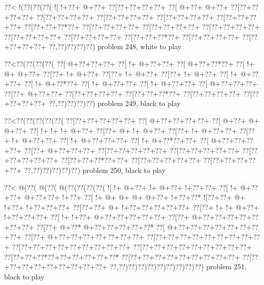 \vbox{\vbox{\goo
\0??<\- !(\0??(\0??(\0??(
\- ![\- !+\0??+\- @+\0??+
\0??[\0??+\0??+\0??+\0??+
\0??[\- @+\0??+\- @+\0??+
\0??[\0??+\0??+\0??+\0??+
\0??[\0??+\0??+\0??+\0??+
\0??[\0??+\0??+\0??+\0??+
\0??[\0??+\0??+\0??+\0??+
\0??[\0??+\0??+\0??+\0??+
\0??[\0??+\0??+\0??*\0??+
\0??[\0??+\0??+\0??+\0??+
\0??[\0??+\0??+\0??+\0??+
\0??[\0??+\0??+\0??+\0??+
\0??[\0??+\0??+\0??+\0??+
\0??[\0??+\0??+\0??+\0??+
\0??[\0??+\0??+\0??*\0??+
\0??[\0??+\0??+\0??+\0??+
\0??[\0??+\0??+\0??+\0??+
\0??,\0??)\0??)\0??)\0??)
}
\hfil problem 248, white to play\hfil\break
}

\vbox{\vbox{\goo
\0??<\0??(\0??(\0??(\0??(
\0??[\- @+\0??+\0??+\0??+
\0??[\- !+\- @+\0??+\0??+
\0??[\- @+\0??+\0??*\0??+
\0??[\- !+\- @+\- @+\0??+
\0??[\0??+\- !+\- @+\0??+
\0??[\0??+\- !+\- @+\0??+
\0??[\0??+\- !+\- @+\0??+
\0??[\- !+\- @+\0??+\0??+
\0??[\- !+\- @+\0??*\0??+
\0??[\- !+\- @+\0??+\0??+
\0??[\- !+\- @+\0??+\0??+
\0??[\- @+\0??+\0??+\0??+
\0??[\0??+\- @+\0??+\0??+
\0??[\0??+\0??+\0??+\0??+
\0??[\0??+\0??+\0??*\0??+
\0??[\0??+\0??+\0??+\0??+
\0??[\0??+\0??+\0??+\0??+
\0??,\0??)\0??)\0??)\0??)
}
\hfil problem 249, black to play\hfil\break
}

\vbox{\vbox{\goo
\0??<\0??(\0??(\0??(\0??(\0??(
\0??[\0??+\0??+\0??+\0??+\0??+
\0??[\- @+\0??+\0??+\0??+\0??+
\0??[\- @+\0??+\- @+\- @+\0??+
\0??[\- !+\- !+\- !+\- @+\0??+
\0??[\0??+\- @+\- !+\- @+\0??+
\0??[\0??+\- !+\- @+\0??+\0??+
\0??[\0??+\- !+\- @+\0??+\0??+
\0??[\- !+\- @+\0??+\0??+\0??+
\0??[\- !+\- @+\0??*\0??+\0??+
\0??[\- @+\0??+\0??+\0??+\0??+
\0??[\0??+\- @+\0??+\0??+\0??+
\0??[\0??+\0??+\0??+\0??+\0??+
\0??[\0??+\0??+\0??+\0??+\0??+
\0??[\0??+\0??+\0??+\0??+\0??+
\0??[\0??+\0??+\0??*\0??+\0??+
\0??[\0??+\0??+\0??+\0??+\0??+
\0??[\0??+\0??+\0??+\0??+\0??+
\0??,\0??)\0??)\0??)\0??)\0??)
}
\hfil problem 250, black to play\hfil\break
}

\vbox{\vbox{\goo
\0??<\- @(\0??(\- @(\0??(\- @(\0??(\0??(\0??(\0??(
\- ![\- !+\- @+\0??+\- !+\- @+\0??+\- !+\0??+\0??+
\0??[\- !+\- @+\0??+\0??+\- @+\0??+\0??+\- !+\0??+
\0??[\- !+\- @+\- @+\- @+\- @+\0??+\- !+\0??+\0??*
\- ![\0??+\0??+\- @+\- !+\0??+\- !+\0??+\0??+\0??+
\0??[\0??+\0??+\- @+\- !+\0??+\0??+\0??+\0??+\0??+
\0??[\0??+\- !+\- !+\- @+\0??+\- !+\0??+\0??+\0??+
\0??[\- !+\- !+\0??+\- @+\0??+\0??+\0??+\0??+\0??+
\0??[\0??+\- @+\0??+\0??+\0??+\0??+\0??+\0??+\0??+
\0??[\0??+\- @+\0??*\- @+\0??+\0??+\0??+\0??+\0??*
\0??[\- @+\0??+\0??+\0??+\0??+\0??+\0??+\0??+\0??+
\0??[\0??+\- @+\0??+\0??+\0??+\0??+\0??+\0??+\0??+
\0??[\0??+\0??+\0??+\0??+\0??+\0??+\0??+\0??+\0??+
\0??[\0??+\0??+\0??+\0??+\0??+\0??+\0??+\0??+\0??+
\0??[\0??+\0??+\0??+\0??+\0??+\0??+\0??+\0??+\0??+
\0??[\0??+\0??+\0??*\0??+\0??+\0??+\0??+\0??+\0??*
\0??[\0??+\0??+\0??+\0??+\0??+\0??+\0??+\0??+\0??+
\0??[\0??+\0??+\0??+\0??+\0??+\0??+\0??+\0??+\0??+
\0??,\0??)\0??)\0??)\0??)\0??)\0??)\0??)\0??)\0??)
}
\hfil problem 251, black to play\hfil\break
}

